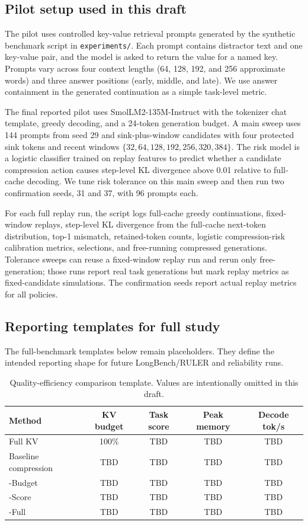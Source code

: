 \subsection{Pilot setup used in this draft}

The pilot uses controlled key-value retrieval prompts generated by the synthetic benchmark script in \texttt{experiments/}. Each prompt contains distractor text and one key-value pair, and the model is asked to return the value for a named key. Prompts vary across four context lengths (64, 128, 192, and 256 approximate words) and three answer positions (early, middle, and late). We use answer containment in the generated continuation as a simple task-level metric.

The final reported pilot uses SmolLM2-135M-Instruct with the tokenizer chat template, greedy decoding, and a 24-token generation budget. A main sweep uses 144 prompts from seed 29 and sink-plus-window candidates with four protected sink tokens and recent windows $\{32,64,128,\allowbreak 192,256,320,384\}$. The risk model is a logistic classifier trained on replay features to predict whether a candidate compression action causes step-level KL divergence above 0.01 relative to full-cache decoding. We tune \uckv{} risk tolerance on this main sweep and then run two confirmation seeds, 31 and 37, with 96 prompts each.

For each full replay run, the script logs full-cache greedy continuations, fixed-window replays, step-level KL divergence from the full-cache next-token distribution, top-1 mismatch, retained-token counts, logistic compression-risk calibration metrics, \uckv{} selections, and free-running compressed generations. Tolerance sweeps can reuse a fixed-window replay run and rerun only \uckv{} free-generation; those runs report real task generations but mark replay metrics as fixed-candidate simulations. The confirmation seeds report actual replay metrics for all policies.

\subsection{Reporting templates for full study}

The full-benchmark templates below remain placeholders. They define the intended reporting shape for future LongBench/RULER and reliability runs.

\begin{table}[h]
\centering
\caption{Quality-efficiency comparison template. Values are intentionally omitted in this draft.}
\begin{tabular}{lcccc}
\toprule
Method & KV budget & Task score & Peak memory & Decode tok/s \\
\midrule
Full KV & 100\% & TBD & TBD & TBD \\
Baseline compression & TBD & TBD & TBD & TBD \\
\uckv{}-Budget & TBD & TBD & TBD & TBD \\
\uckv{}-Score & TBD & TBD & TBD & TBD \\
\uckv{}-Full & TBD & TBD & TBD & TBD \\
\bottomrule
\end{tabular}
\end{table}

